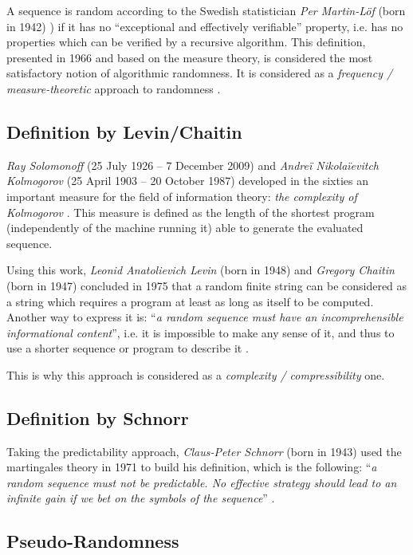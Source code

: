 \documentclass{llncs}
\begin{document}
A sequence is random according to the Swedish statistician \emph{Per Martin-L\"{o}f} (born in 1942) ) if it has no ``exceptional and effectively verifiable'' property, i.e. has no properties which can be verified by a recursive algorithm. This definition, presented in 1966 and based on the measure theory, is considered the most satisfactory notion of algorithmic randomness. It is considered as a \textit{frequency / measure-theoretic} approach to randomness \cite{down}.

\subsection{Definition by Levin/Chaitin}

\emph{Ray Solomonoff} (25 July 1926 – 7 December 2009) and \emph{Andreï Nikolaïevitch Kolmogorov} (25 April 1903 – 20 October 1987) developed in the sixties an important measure for the field of information theory: \emph{the complexity of Kolmogorov} \cite{down}. This measure is defined as the length of the shortest program (independently of the machine running it) able to generate the evaluated sequence. 


Using this work, \emph{Leonid Anatolievich Levin} (born in 1948) and \emph{Gregory Chaitin} (born in 1947) concluded in 1975 that a random finite string can be considered as a string which requires a program at least as long as itself to be computed. Another way to express it is: ``\textit{a random sequence must have an incomprehensible informational content}'', i.e. it is impossible to make any sense of it, and thus to use a shorter sequence or program to describe it \cite{down}.

This is why this approach is considered as a \textit{complexity / compressibility} one.

\subsection{Definition by Schnorr}

Taking the predictability approach, \emph{Claus-Peter Schnorr} (born in 1943) used the martingales theory in 1971 to build his definition, which is the following: ``\textit{a random sequence must not be predictable. No effective strategy should lead to an infinite gain if we bet on the symbols of the sequence}'' \cite{down}.



\subsection{Pseudo-Randomness}
\end{document}
